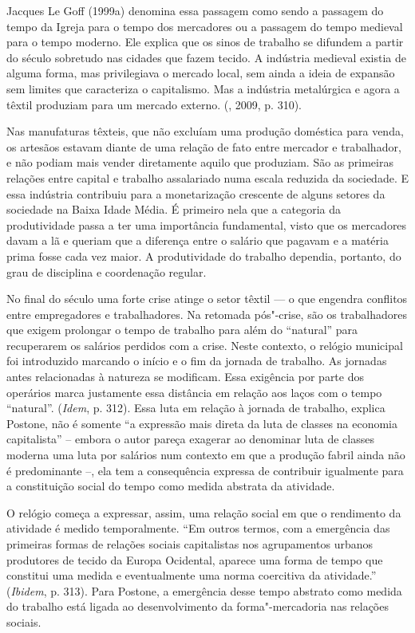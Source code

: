 Jacques Le Goff (1999a) denomina essa passagem como sendo a passagem do
tempo da Igreja para o tempo dos mercadores ou a passagem do tempo
medieval para o tempo moderno. Ele explica que os sinos de trabalho se
difundem a partir do século  sobretudo nas cidades que fazem tecido.
A indústria medieval existia de alguma forma, mas privilegiava o mercado
local, sem ainda a ideia de expansão sem limites que caracteriza o
capitalismo. Mas a indústria metalúrgica e agora a têxtil produziam para
um mercado externo. (, 2009, p. 310).

Nas manufaturas têxteis, que não excluíam uma produção doméstica para
venda, os artesãos estavam diante de uma relação de fato entre
mercador e trabalhador, e não podiam mais vender diretamente aquilo que
produziam. São as primeiras relações entre capital e trabalho
assalariado numa escala reduzida da sociedade. E essa indústria
contribuiu para a monetarização crescente de alguns setores da sociedade
na Baixa Idade Média. É primeiro nela que a categoria da produtividade
passa a ter uma importância fundamental, visto que os mercadores davam a
lã e queriam que a diferença entre o salário que pagavam e a matéria
prima fosse cada vez maior. A produtividade do trabalho dependia,
portanto, do grau de disciplina e coordenação regular.

No final do século  uma forte crise atinge o setor têxtil --- o que
engendra conflitos entre empregadores e trabalhadores. Na retomada
pós"-crise, são os trabalhadores que exigem prolongar o tempo de trabalho
para além do ``natural'' para recuperarem os salários perdidos com a
crise. Neste contexto, o relógio municipal foi introduzido marcando o
início e o fim da jornada de trabalho. As jornadas antes relacionadas à
natureza se modificam. Essa exigência por parte dos operários marca
justamente essa distância em relação aos laços com o tempo ``natural''.
(\emph{Idem}, p. 312). Essa luta em relação à jornada de trabalho,
explica Postone, não é somente ``a expressão mais direta da luta de
classes na economia capitalista'' -- embora o autor pareça exagerar ao
denominar luta de classes moderna uma luta por salários num contexto em
que a produção fabril ainda não é predominante --, ela tem a
consequência expressa de contribuir igualmente para a constituição
social do tempo como medida abstrata da atividade.

O relógio começa a expressar, assim, uma relação social em que o
rendimento da atividade é medido temporalmente. ``Em outros termos, com
a emergência das primeiras formas de relações sociais capitalistas nos
agrupamentos urbanos produtores de tecido da Europa Ocidental, aparece
uma forma de tempo que constitui uma medida e eventualmente uma norma
coercitiva da atividade.'' (\emph{Ibidem}, p. 313). Para Postone, a
emergência desse tempo abstrato como medida do trabalho está ligada ao
desenvolvimento da forma"-mercadoria nas relações sociais.

